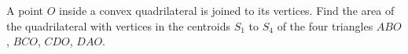 A point $O$ inside a convex quadrilateral is joined to its vertices. Find the area of the quadrilateral with vertices in the centroids $S_1$ to $S_4$ of the four triangles $ABO$, $BCO$, $CDO$, $DAO$.
